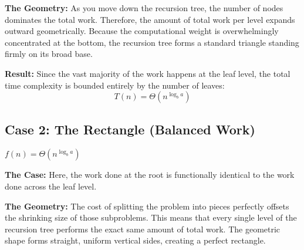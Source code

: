\documentclass[11pt, a4paper]{article}
\begin{document}
\textbf{The Geometry:} As you move down the recursion tree, the number of nodes dominates the total work. Therefore, the amount of total work per level expands outward geometrically. Because the computational weight is overwhelmingly concentrated at the bottom, the recursion tree forms a standard triangle standing firmly on its broad base. 

\textbf{Result:} Since the vast majority of the work happens at the leaf level, the total time complexity is bounded entirely by the number of leaves: 
\begin{equation*}
    T(n) = \Theta(n^{\log_b a})
\end{equation*}

\vspace{0.5cm}
\begin{center}
\end{center}
\vspace{1cm}

\subsection*{Case 2: The Rectangle (Balanced Work)}

\begin{tcolorbox}[colback=accent3!10, colframe=accent3, title=\textbf{Condition}]
$f(n) = \Theta(n^{\log_b a})$
\end{tcolorbox}
\textbf{The Case:} Here, the work done at the root is functionally identical to the work done across the leaf level.

\textbf{The Geometry:} The cost of splitting the problem into pieces perfectly offsets the shrinking size of those subproblems. This means that every single level of the recursion tree performs the exact same amount of total work. The geometric shape forms straight, uniform vertical sides, creating a perfect rectangle.
\end{document}
